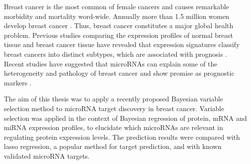 Breast cancer is the most common of female cancers and causes remarkable
morbidity and mortality word-wide. Annually more than 1.5 million women
develop breast cancer \citep{Ferlay2015}. Thus, breast cancer constitutes a
major global health problem. Previous studies comparing the expression
profiles of normal breast tissue and breast cancer tissue have revealed that
expression signatures classify breast cancers into distinct subtypes, which
are associated with prognosis \citep{Sorlie2001}. Recent studies have
suggested that microRNAs can explain some of the heterogeneity and pathology
of breast cancer and show promise as prognostic markers
\citep{vanSchooneveld2015}.

The aim of this thesis was to apply a recently proposed Bayesian variable
selection method to microRNA target discovery in breast cancer. Variable
selection was applied in the context of Bayesian regression of protein, mRNA
and miRNA expression profiles, to elucidate which microRNAs are
relevant in regulating protein expression levels. The prediction results were
compared with lasso regression, a popular method for target prediction, and
with known validated microRNA targets.

